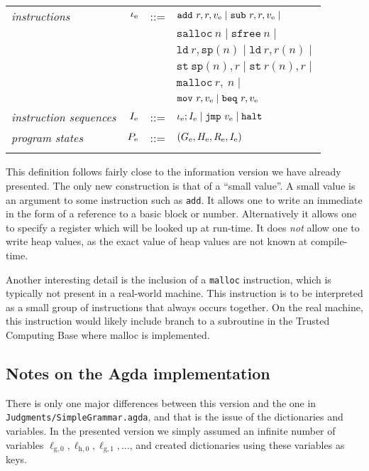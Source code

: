 {\begin{tabular}{lrcl}
\textit{instructions} & ${{\iota}_{\mathrm{e}}}$ & ::= & $\mathtt{add}\ r, r, \simple v \mid \mathtt{sub}\ r, r, \simple v \mid$ \\
        &&& $\mathtt{salloc}\ n \mid \mathtt{sfree}\ n \mid$ \\
        &&& $\mathtt{ld}\ r, \mathtt{sp}(n) \mid \mathtt{ld}\ r, r(n) \mid$ \\
        &&& $\mathtt{st}\ \mathtt{sp}(n), r \mid \mathtt{st}\ r(n), r \mid$ \\
        &&& $\mathtt{malloc}\ r,\ n \mid $ \\
        &&& $\mathtt{mov}\ r, \simple v \mid \mathtt{beq}\ r, \simple v$ \\
\textit{instruction sequences} & ${{I}_{\mathrm{e}}}$ & ::= & ${{\iota}_{\mathrm{e}}} ; {{I}_{\mathrm{e}}} \mid \mathtt{jmp}\ {{v}_{\mathrm{e}}} \mid \mathtt{halt}$ \\
\textit{program states} & ${{P}_{\mathrm{e}}}$ & ::= & $({{G}_{\mathrm{e}}}, {{H}_{\mathrm{e}}}, {{R}_{\mathrm{e}}}, {{I}_{\mathrm{e}}})$ \\\\
\end{tabular}
}

This definition follows fairly close to the information version we have already
presented. The only new construction is that of a ``small value''. A small value
is an argument to some instruction such as \texttt{add}. It allows one to write
an immediate in the form of a reference to a basic block or
number. Alternatively it allows one to specify a register which will be looked
up at run-time. It does \emph{not} allow one to write heap values, as the exact
value of heap values are not known at compile-time.

Another interesting detail is the inclusion of a \texttt{malloc} instruction,
which is typically not present in a real-world machine. This instruction is to
be interpreted as a small group of instructions that always occurs together. On
the real machine, this instruction would likely include branch to a subroutine
in the Trusted Computing Base where malloc is implemented.

\subsection{Notes on the Agda implementation}

There is only one major differences between this version and the one in
\texttt{Judgments/SimpleGrammar.agda}, and that is the issue of the dictionaries
and variables. In the presented version we simply assumed an infinite number of
variables
$\ell_{\mathrm{g},0}, \ell_{\mathrm{h},0}, \ell_{\mathrm{g},1}, \dots$, and
created dictionaries using these variables as keys.

